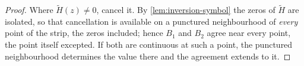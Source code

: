 \begin{proof}
\leanok
{}
Where $\tilde H(z) \ne 0$, cancel it. By \ref{lem:inversion-symbol} the zeros of $\tilde H$ are
isolated, so that cancellation is available on a punctured neighbourhood of \emph{every} point of
the strip, the zeros included; hence $B_1$ and $B_2$ agree near every point, the point itself
excepted. If both are continuous at such a point, the punctured neighbourhood determines the
value there and the agreement extends to it.
\end{proof}


